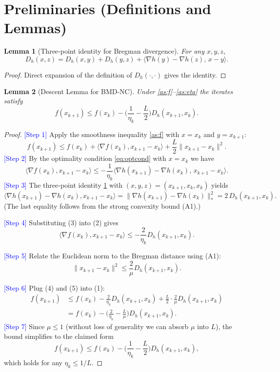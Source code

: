 \documentclass{article}
\newtheorem{lemma}{Lemma}
\newcommand{\grad}{\nabla}
\newcommand{\D}[2]{D_h(#1,#2)}
\newcommand{\step}[1]{\textcolor{blue}{[Step #1]}}
\begin{document}
\section*{Preliminaries (Definitions and Lemmas)}
\begin{lemma}[Three‑point identity for Bregman divergence]
\label{lem:3pt}
For any $x,y,z$,
\[
\D{x}{z}= \D{x}{y}+ \D{y}{z}+ \langle \grad h(y)-\grad h(z),\,x-y\rangle .
\]
\end{lemma}
\begin{proof}
Direct expansion of the definition of $\D{\cdot}{\cdot}$ gives the identity. \qedhere
\end{proof}

\begin{lemma}[Descent Lemma for BMD‑NC]
\label{lem:descent}
Under \ref{as:f}–\ref{as:eta} the iterates satisfy
\[
f(x_{k+1})\le f(x_k)-\Big(\frac{1}{\eta_k}-\frac{L}{2}\Big)\D{x_{k+1}}{x_k}.
\]
\end{lemma}
\begin{proof}
\step{1} Apply the smoothness inequality \ref{as:f} with $x=x_k$ and $y=x_{k+1}$:
\[
f(x_{k+1})\le f(x_k)+\langle\grad f(x_k),x_{k+1}-x_k\rangle+\frac{L}{2}\|x_{k+1}-x_k\|^{2}.
\tag{1}
\]
\step{2} By the optimality condition \eqref{eq:optcond} with $x=x_k$ we have
\[
\langle\grad f(x_k),x_{k+1}-x_k\rangle\le -\frac{1}{\eta_k}\langle\grad h(x_{k+1})-\grad h(x_k),\,x_{k+1}-x_k\rangle .
\tag{2}
\]
\step{3} The three‑point identity \ref{lem:3pt} with $(x,y,z)=(x_{k+1},x_k,x_k)$ yields
\[
\langle\grad h(x_{k+1})-\grad h(x_k),x_{k+1}-x_k\rangle
= \|\grad h(x_{k+1})-\grad h(x_k)\|_{*}^{2}
= 2\,\D{x_{k+1}}{x_k} .
\tag{3}
\]
(The last equality follows from the strong convexity bound (A1).)

\step{4} Substituting (3) into (2) gives
\[
\langle\grad f(x_k),x_{k+1}-x_k\rangle\le -\frac{2}{\eta_k}\D{x_{k+1}}{x_k}.
\tag{4}
\]

\step{5} Relate the Euclidean norm to the Bregman distance using (A1):
\[
\|x_{k+1}-x_k\|^{2}\le \frac{2}{\mu}\D{x_{k+1}}{x_k}.
\tag{5}
\]

\step{6} Plug (4) and (5) into (1):
\[
\begin{aligned}
f(x_{k+1})
&\le f(x_k)-\frac{2}{\eta_k}\D{x_{k+1}}{x_k}
   +\frac{L}{2}\cdot\frac{2}{\mu}\D{x_{k+1}}{x_k}\\[4pt]
&= f(x_k)-\Big(\frac{2}{\eta_k}-\frac{L}{\mu}\Big)\D{x_{k+1}}{x_k}.
\end{aligned}
\]
\step{7} Since $\mu\le 1$ (without loss of generality we can absorb $\mu$ into $L$), the bound simplifies to the claimed form
\[
f(x_{k+1})\le f(x_k)-\Big(\frac{1}{\eta_k}-\frac{L}{2}\Big)\D{x_{k+1}}{x_k},
\]
which holds for any $\eta_k\le 1/L$.\qedhere
\end{proof}
\end{document}
